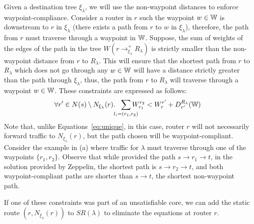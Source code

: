 Given a destination tree $\xi_\lambda$, we will use the 
non-waypoint distances to enforce waypoint-compliance. Consider a 
router in $r$ such the waypoint $w \in \mathbb{W}$ is downstream to $r$ in $\xi_\lambda$
(there exists a path from $r$ to $w$ in $\xi_\lambda$), therefore,
the path from $r$ must traverse through 
a waypoint in $\mathbb{W}$.  
Suppose, the sum of weights of the edges of
the path in the tree $W(r \rightarrow^+_{\xi_\lambda} R_\lambda)$  
is strictly smaller than the non-waypoint 
distance from $r$ to $R_\lambda$. This will ensure that 
the shortest path from $r$ to $R_\lambda$ which does not go through
any $w \in \mathbb{W}$ will have a distance strictly greater than the path through
$\xi_\lambda$, thus, the path from $r$ to $R_\lambda$ will traverse
through a waypoint $w \in \mathbb{W}$. These constraints are expressed as follows:
\begin{equation} \label{eq:waypoint}
\forall r' \in N(s) \setminus N_{\xi_\lambda}(r).~~ \sum_{\mathclap{\substack{l_i=(r_1,r_2)}}} 
W_{r_1}^{r_2} < 
W_{r}^{r'}+ D_{r'}^{R_\lambda}(\waypt) 
\end{equation}
Note that, unlike Equations~\ref{eq:unique}, in this case, 
router $r$ will not necessarily forward traffic to  
$N_{\xi_\lambda}(r)$, but the path chosen will be waypoint-compliant. 
Consider the example in (a) where traffic for
$\lambda$ must traverse through one of the waypoints $\{r_1, r_2\}$. 
Observe that while \genesis provided the path $s \rightarrow 
r_1 \rightarrow t$, in the solution provided by Zeppelin, 
the shortest path is $s \rightarrow r_2
\rightarrow t$, and both waypoint-compliant paths are shorter 
than $s \rightarrow t$, the shortest non-waypoint path.

If one of these constraints was part of an unsatisfiable  
core, we can add the static route $(r, N_{\xi_\lambda}(r))$ to
$SR(\lambda)$ to eliminate the equations at router $r$. 


